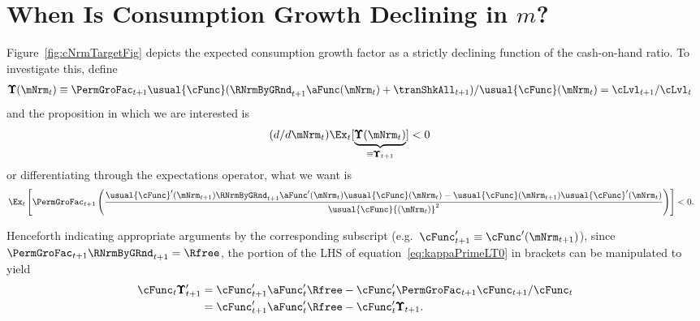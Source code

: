 \documentclass[\econtexRoot/BufferStockTheory]{subfiles}
\begin{document}
\hypertarget{ApndxCGrowthDeclines}{}
\section{When Is Consumption Growth Declining in \texorpdfstring{$m$}{m}?}\label{sec:ApndxCGrowthDeclines}\label{subsec:dcgdxneg}

Figure~\ref{fig:cNrmTargetFig} depicts the expected consumption growth factor as a strictly
declining function of the cash-on-hand ratio. To investigate this,
define
\begin{align*}
  \pmb{\Upsilon}(\mNrm_{t})  & \equiv  \PermGroFac_{t+1} \usual{\cFunc}(\RNrmByGRnd_{t+1}\aFunc(\mNrm_{t})+\tranShkAll_{t+1})/\usual{\cFunc}(\mNrm_{t})  = \cLvl_{t+1}/\cLvl_{t}
\end{align*}
and the proposition in which we are interested is
\begin{align*}
  (d/d\mNrm_{t})\Ex_{t}[\underbrace{\pmb{\Upsilon}(\mNrm_{t})}_{\equiv \pmb{\Upsilon}_{t+1}}]  & < 0  
\end{align*}
or differentiating through the expectations operator, what we want is
\begin{align}
  \Ex_{t}\left[\PermGroFac_{t+1} \left(\frac{\usual{\cFunc}^{\prime}(\mNrm_{t+1})\RNrmByGRnd_{t+1}\aFunc^{\prime}(\mNrm_{t})\usual{\cFunc}(\mNrm_{t})-\usual{\cFunc}(\mNrm_{t+1})\usual{\cFunc}^{\prime}(\mNrm_{t})}{\usual{\cFunc}{(\mNrm_{t})}^{2}}\right)\right]  & < 0 \label{eq:kappaPrimeLT0}.
\end{align}

Henceforth indicating appropriate arguments by the corresponding
subscript (e.g.\ $\cFunc_{t+1}^{\prime} \equiv \cFunc^{\prime}(\mNrm_{t+1})$), since
$\PermGroFac_{t+1}\RNrmByGRnd_{t+1}=\Rfree$, the portion of the LHS of equation~\eqref{eq:kappaPrimeLT0} in brackets can be manipulated to yield
\begin{equation}\begin{gathered}\begin{aligned}
  \cFunc_{t} \pmb{\Upsilon}^{\prime}_{t+1}  & = \cFunc^{\prime}_{t+1}\aFunc^{\prime}_{t}\Rfree-\cFunc^{\prime}_{t} \PermGroFac_{t+1} \cFunc_{t+1}/\cFunc_{t} \nonumber
  \\  & = \cFunc^{\prime}_{t+1}\aFunc^{\prime}_{t}\Rfree-\cFunc^{\prime}_{t} \pmb{\Upsilon}_{t+1} \label{eq:cPrimek}
        .
\end{aligned}\end{gathered}\end{equation}
\end{document}
